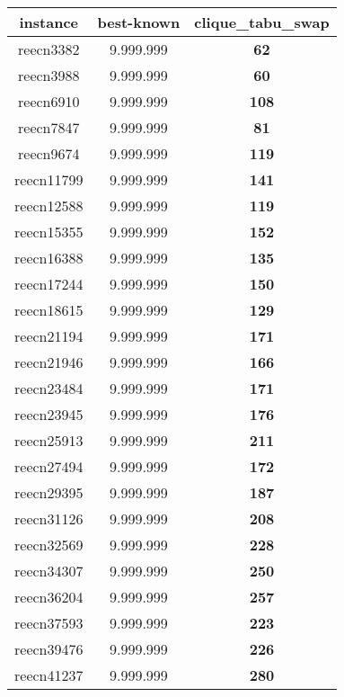 \begin{tabular}{cc||c}
instance & best-known & clique\_tabu\_swap \\ 
 \hline 
reecn3382        & 9.999.999        & {\bf 62}        \\ 
reecn3988        & 9.999.999        & {\bf 60}        \\ 
reecn6910        & 9.999.999        & {\bf 108}       \\ 
reecn7847        & 9.999.999        & {\bf 81}        \\ 
reecn9674        & 9.999.999        & {\bf 119}       \\ 
reecn11799       & 9.999.999        & {\bf 141}       \\ 
reecn12588       & 9.999.999        & {\bf 119}       \\ 
reecn15355       & 9.999.999        & {\bf 152}       \\ 
reecn16388       & 9.999.999        & {\bf 135}       \\ 
reecn17244       & 9.999.999        & {\bf 150}       \\ 
reecn18615       & 9.999.999        & {\bf 129}       \\ 
reecn21194       & 9.999.999        & {\bf 171}       \\ 
reecn21946       & 9.999.999        & {\bf 166}       \\ 
reecn23484       & 9.999.999        & {\bf 171}       \\ 
reecn23945       & 9.999.999        & {\bf 176}       \\ 
reecn25913       & 9.999.999        & {\bf 211}       \\ 
reecn27494       & 9.999.999        & {\bf 172}       \\ 
reecn29395       & 9.999.999        & {\bf 187}       \\ 
reecn31126       & 9.999.999        & {\bf 208}       \\ 
reecn32569       & 9.999.999        & {\bf 228}       \\ 
reecn34307       & 9.999.999        & {\bf 250}       \\ 
reecn36204       & 9.999.999        & {\bf 257}       \\ 
reecn37593       & 9.999.999        & {\bf 223}       \\ 
reecn39476       & 9.999.999        & {\bf 226}       \\ 
reecn41237       & 9.999.999        & {\bf 280}       \\ 

\end{tabular}
